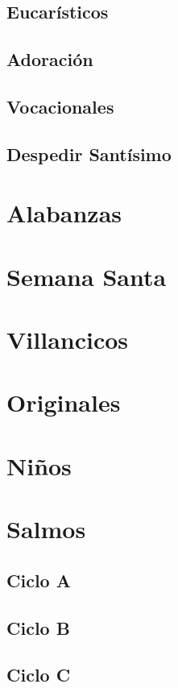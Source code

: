 \documentclass[a4paper,12pt]{book}
\begin{document}
\section{Eucarísticos}



\section{Adoración}



\section{Vocacionales}



\section{Despedir Santísimo}





\chapter{Alabanzas}






\chapter{Semana Santa}






\chapter{Villancicos}






\chapter{Originales}






\chapter{Niños}






\chapter{Salmos}

\section{Ciclo A}



\section{Ciclo B}



\section{Ciclo C}


\end{document}
